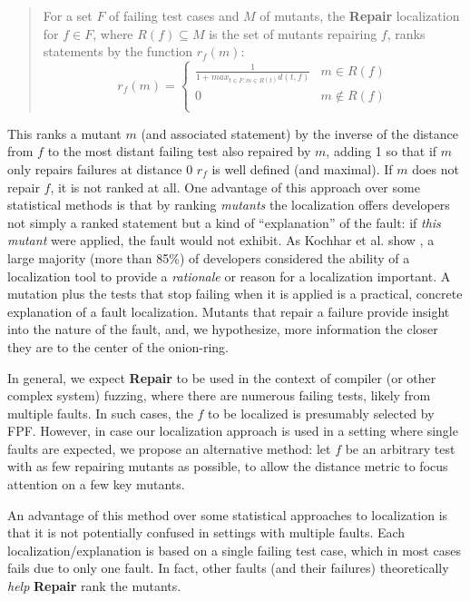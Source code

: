 \begin{quote}
For a set $F$ of failing test cases and $M$ of mutants, 
the {\bf Repair} localization for $f \in F$, where $R(f) \subseteq M$ is the set
of mutants repairing $f$, ranks
statements by the function $r_f(m)$:
\[
r_f(m) = 
\begin{cases}
\frac{1}{1 + max_{t \in F: m \in R(t)} d(t,f)} & m \in R(f)\\
0 & m \not\in R(f)\\
\end{cases}
\]
\end{quote}

This ranks a mutant $m$ (and associated statement) by the inverse of the distance
from $f$ to the most distant failing test also repaired by $m$, adding 1
so that if $m$ only repairs failures at distance 0 $r_f$ is well defined
(and maximal).
If $m$ does not repair $f$, it is not ranked at all.  One advantage of
this approach over some statistical methods is that by
ranking \emph{mutants} the localization offers developers not simply a
ranked statement but a kind of ``explanation'' \cite{GroceError} of the fault:  if \emph{this
mutant} were applied, the fault would not exhibit.  As Kochhar et
al. show \cite{Kochhar}, a large majority (more than 85\%) of developers considered
the ability of a localization tool to provide a \emph{rationale} or
reason for a localization important.  A mutation plus the tests that
stop failing when it is applied is a practical, concrete explanation
of a fault localization.  Mutants that repair a failure provide insight 
into the nature of the fault, and, we hypothesize, more information the 
closer they are to the center of the onion-ring. 


In general, we expect {\bf Repair} to be used in the context of
compiler (or other complex system) fuzzing, where there are numerous
failing tests, likely from multiple faults.  In such cases, the $f$ to
be localized is presumably selected by FPF.  However, in case our
localization approach is used in a setting where single faults are
expected, we propose an alternative method: let $f$ be an arbitrary
test with as few repairing mutants as possible, to allow the distance
metric to focus attention on a few key mutants. 

An advantage of this method over some statistical approaches to 
localization is that it is not potentially confused in 
settings with multiple faults.  Each localization/explanation is based 
on a single failing test case, which in most cases fails due to only one 
fault.  In fact, other faults (and their failures) theoretically \emph{help} {\bf Repair} rank the mutants. 



